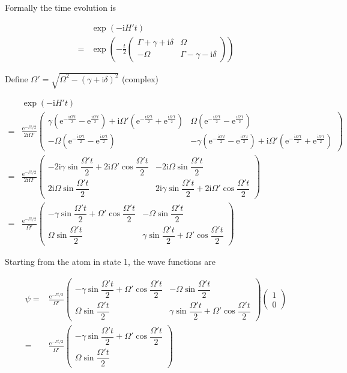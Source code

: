 \documentclass[10pt,fleqn]{article}
\newcommand{\ue}{\mathrm{e}}
\newcommand{\ui}{\mathrm{i}}
\newcommand{\eqar}[1]
{
  \begin{align*}
    #1
  \end{align*}
}
\newcommand{\paren}[1]{{\left({#1}\right)}}
\begin{document}
Formally the time evolution is
\eqar{
  &\exp\paren{-\ui H't}\\
  =&\exp\paren{-\frac t2\begin{pmatrix}
      \Gamma+\gamma+\ui\delta&\Omega\\
      -\Omega&\Gamma-\gamma-\ui\delta
    \end{pmatrix}}
}
Define $\Omega'=\sqrt{\Omega^2-\paren{\gamma+\ui\delta}^2}$ (complex)
\eqar{
  &\exp\paren{-\ui H't}\\
  =&\frac{\ue^{-\Gamma t/2}}{2\ui\Omega'}\begin{pmatrix}
    \gamma\paren{\ue^{-\frac{\ui\Omega't}{2}}-\ue^{\frac{\ui\Omega't}{2}}}+\ui\Omega'\paren{\ue^{-\frac{\ui\Omega't}{2}}+\ue^{\frac{\ui\Omega't}{2}}}&\Omega\paren{\ue^{-\frac{\ui\Omega't}{2}}-\ue^{\frac{\ui\Omega't}{2}}}\\
    -\Omega\paren{\ue^{-\frac{\ui\Omega't}{2}}-\ue^{\frac{\ui\Omega't}{2}}}&-\gamma\paren{\ue^{-\frac{\ui\Omega't}{2}}-\ue^{\frac{\ui\Omega't}{2}}}+\ui\Omega'\paren{\ue^{-\frac{\ui\Omega't}{2}}+\ue^{\frac{\ui\Omega't}{2}}}
  \end{pmatrix}\\
  =&\frac{\ue^{-\Gamma t/2}}{2\ui\Omega'}\begin{pmatrix}
    -2\ui\gamma\sin\dfrac{\Omega't}{2}+2\ui\Omega'\cos\dfrac{\Omega't}{2}&-2\ui\Omega\sin\dfrac{\Omega't}{2}\\
    2\ui\Omega\sin\dfrac{\Omega't}{2}&2\ui\gamma\sin\dfrac{\Omega't}{2}+2\ui\Omega'\cos\dfrac{\Omega't}{2}
  \end{pmatrix}\\
  =&\frac{\ue^{-\Gamma t/2}}{\Omega'}\begin{pmatrix}
    -\gamma\sin\dfrac{\Omega't}{2}+\Omega'\cos\dfrac{\Omega't}{2}&-\Omega\sin\dfrac{\Omega't}{2}\\
    \Omega\sin\dfrac{\Omega't}{2}&\gamma\sin\dfrac{\Omega't}{2}+\Omega'\cos\dfrac{\Omega't}{2}
  \end{pmatrix}
}
Starting from the atom in state 1, the wave functions are
\eqar{
  \psi=&\frac{\ue^{-\Gamma t/2}}{\Omega'}\begin{pmatrix}
    -\gamma\sin\dfrac{\Omega't}{2}+\Omega'\cos\dfrac{\Omega't}{2}&-\Omega\sin\dfrac{\Omega't}{2}\\
    \Omega\sin\dfrac{\Omega't}{2}&\gamma\sin\dfrac{\Omega't}{2}+\Omega'\cos\dfrac{\Omega't}{2}
  \end{pmatrix}\begin{pmatrix}
    1\\
    0
  \end{pmatrix}\\
  =&\frac{\ue^{-\Gamma t/2}}{\Omega'}\begin{pmatrix}
    -\gamma\sin\dfrac{\Omega't}{2}+\Omega'\cos\dfrac{\Omega't}{2}\\
    \Omega\sin\dfrac{\Omega't}{2}
  \end{pmatrix}
}
\end{document}
